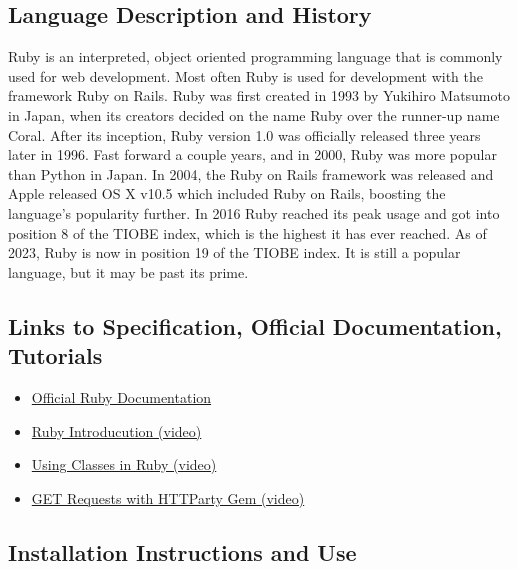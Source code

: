 \documentclass{article}
\begin{document}
\subsection{Language Description and History}
  Ruby is an interpreted, object oriented programming language that is commonly used for web development. Most often Ruby is used for development with the framework Ruby on Rails. Ruby was first created in 1993 by Yukihiro Matsumoto in Japan, when its creators decided on the name Ruby over the runner-up name Coral. After its inception, Ruby version 1.0 was officially released three years later in 1996. Fast forward a couple years, and in 
  2000, Ruby was more popular than Python in Japan. In 2004, the Ruby on Rails framework was released and Apple released OS X v10.5 which included Ruby on Rails, boosting the language's popularity further. In 2016 Ruby reached its peak usage and got into position 8 of the TIOBE index, which is the highest it has ever reached.
  As of 2023, Ruby is now in position 19 of the TIOBE index. It is still a popular language, but it may be past its prime.

\subsection{Links to Specification, Official Documentation, Tutorials}
  \begin{itemize}
    \item \href{https://www.ruby-lang.org/en/documentation/}{Official Ruby Documentation}
    \item \href{https://www.youtube.com/watch?v=ml5sNqftiK4}{Ruby Introducution (video)}
    \item \href{https://www.youtube.com/watch?v=mPdD8ms5gEQ}{Using Classes in Ruby (video)}
    \item \href{https://www.youtube.com/watch?v=QJKQBPzZRTQ}{GET Requests with HTTParty Gem (video)}
  \end{itemize}

\subsection{Installation Instructions and Use}
\end{document}
